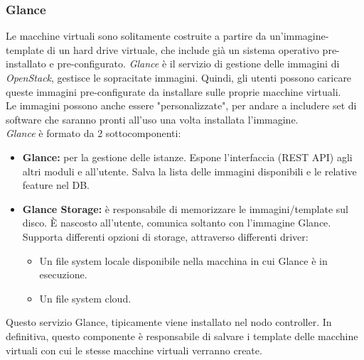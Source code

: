 \documentclass{article}
\begin{document}
\subsubsection{Glance}
Le macchine virtuali sono solitamente costruite a partire da un'immagine-template di un hard drive virtuale, che include già un sistema operativo pre-installato e pre-configurato. \textit{Glance} è il servizio di gestione delle immagini di \textit{OpenStack}, gestisce le sopracitate immagini. Quindi, gli utenti possono caricare queste immagini pre-configurate da installare sulle proprie macchine virtuali. \\
Le immagini possono anche essere "personalizzate", per andare a includere set di software che saranno pronti all'uso una volta installata l'immagine. \\
\textit{Glance} è formato da 2 sottocomponenti: 
\begin{itemize}
    \item \textbf{Glance:} per la gestione delle istanze. Espone l'interfaccia (REST API) agli altri moduli e all'utente. Salva la lista delle immagini disponibili e le relative feature nel DB.
    \item \textbf{Glance Storage:} è responsabile di memorizzare le immagini/template sul disco. È nascosto all'utente, comunica soltanto con l'immagine Glance. Supporta differenti opzioni di storage, attraverso differenti driver:
    \begin{itemize}
        \item Un file system locale disponibile nella macchina in cui Glance è in esecuzione.
        \item Un file system cloud.
    \end{itemize}
\end{itemize}
Questo servizio Glance, tipicamente viene installato nel nodo controller. In definitiva, questo componente è responsabile di salvare i template delle macchine virtuali con cui le stesse macchine virtuali verranno create.
\end{document}
